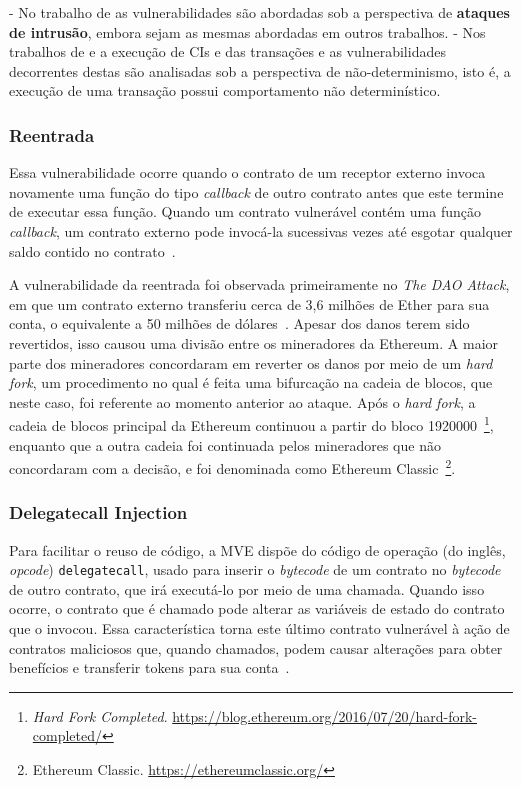 - No trabalho de \cite{wang2019contractguard-19} as vulnerabilidades são abordadas sob a perspectiva de \textbf{ataques de intrusão}, embora sejam as mesmas abordadas em outros trabalhos.
- Nos trabalhos de \cite{wang2019detecting-nondeterministic-26} e \cite{kolluri2019exploiting-37} a execução de CIs e das transações e as vulnerabilidades decorrentes destas são analisadas sob a perspectiva de não-determinismo, isto é, a execução de uma transação possui comportamento não determinístico.

\subsubsection*{\textbf{Reentrada}}

Essa vulnerabilidade ocorre quando o contrato de um receptor externo invoca novamente uma função do tipo \textit{callback} de outro contrato antes que este termine de executar essa função. Quando um contrato vulnerável contém uma função \textit{callback}, um contrato externo pode invocá-la sucessivas vezes até esgotar qualquer saldo contido no contrato~\cite{chen2020survey-ethereum-acm, sayeed2020smart-attacks-ieee}. 

A vulnerabilidade da reentrada foi observada primeiramente no \textit{The DAO Attack}, em que um contrato externo transferiu cerca de 3,6 milhões de Ether para sua conta, o equivalente a 50 milhões de dólares~\cite{siegel-dao-attack}. Apesar dos danos terem sido revertidos, isso causou uma divisão entre os mineradores da Ethereum. A maior parte dos mineradores concordaram em reverter os danos por meio de um \textit{hard fork}, um procedimento no qual é feita uma bifurcação na cadeia de blocos, que neste caso, foi referente ao momento anterior ao ataque. Após o \textit{hard fork}, a cadeia de blocos principal da Ethereum continuou a partir do bloco 1920000~\footnote{\textit{Hard Fork Completed}. \url{https://blog.ethereum.org/2016/07/20/hard-fork-completed/}}, enquanto que a outra cadeia foi continuada pelos mineradores que não concordaram com a decisão, e foi denominada como Ethereum Classic~\footnote{Ethereum Classic. \url{https://ethereumclassic.org/}}.  

\subsubsection*{\textbf{Delegatecall Injection}}

Para facilitar o reuso de código, a MVE dispõe do código de operação (do inglês, \textit{opcode}) \texttt{delegatecall}, usado para inserir o \textit{bytecode} de um contrato no \textit{bytecode} de outro contrato, que irá executá-lo por meio de uma chamada. Quando isso ocorre, o contrato que é chamado pode alterar as variáveis de estado do contrato que o invocou. Essa característica torna este último contrato vulnerável à ação de contratos maliciosos que, quando chamados, podem causar alterações para obter benefícios e transferir tokens para sua conta~\cite{chen2020survey-ethereum-acm}.

